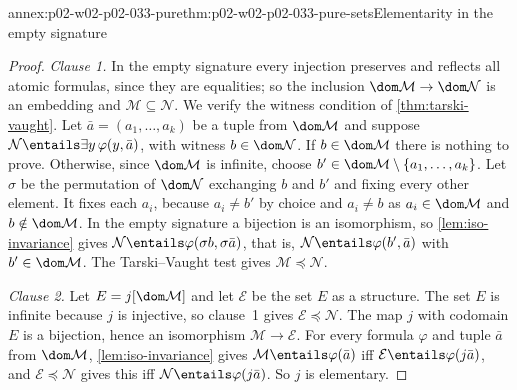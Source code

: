 \begin{annexitem}{annex:p02-w02-p02-033-pure}{thm:p02-w02-p02-033-pure-sets}{Elementarity in the empty signature}
\begin{proof}
\emph{Clause 1.}  In the empty signature every injection preserves and
reflects all atomic formulas, since they are equalities; so the inclusion
\(\dom\mathcal M\to\dom\mathcal N\) is an embedding and
\(\mathcal M\subseteq\mathcal N\).  We verify the witness condition of
\cref{thm:tarski-vaught}.  Let \(\bar a=(a_1,\ldots,a_k)\) be a tuple from
\(\dom\mathcal M\) and suppose
\(\mathcal N\entails\exists y\,\varphi(y,\bar a)\), with witness \(b\in
\dom\mathcal N\).  If \(b\in\dom\mathcal M\) there is nothing to prove.
Otherwise, since \(\dom\mathcal M\) is infinite, choose
\(b'\in\dom\mathcal M\setminus\{a_1,\ldots,a_k\}\).  Let \(\sigma\) be the
permutation of \(\dom\mathcal N\) exchanging \(b\) and \(b'\) and fixing
every other element.  It fixes each \(a_i\), because \(a_i\ne b'\) by choice
and \(a_i\ne b\) as \(a_i\in\dom\mathcal M\) and \(b\notin\dom\mathcal M\).
In the empty signature a bijection is an isomorphism, so
\cref{lem:iso-invariance} gives
\(\mathcal N\entails\varphi(\sigma b,\sigma\bar a)\), that is,
\(\mathcal N\entails\varphi(b',\bar a)\) with \(b'\in\dom\mathcal M\).  The
Tarski--Vaught test gives \(\mathcal M\preccurlyeq\mathcal N\).

\emph{Clause 2.}  Let \(E=j[\dom\mathcal M]\) and let \(\mathcal E\) be the
set \(E\) as a structure.  The set \(E\) is infinite because \(j\) is
injective, so clause~1 gives \(\mathcal E\preccurlyeq\mathcal N\).  The map
\(j\) with codomain \(E\) is a bijection, hence an isomorphism
\(\mathcal M\to\mathcal E\).  For every formula \(\varphi\) and tuple
\(\bar a\) from \(\dom\mathcal M\), \cref{lem:iso-invariance} gives
\(\mathcal M\entails\varphi(\bar a)\) iff
\(\mathcal E\entails\varphi(j\bar a)\), and
\(\mathcal E\preccurlyeq\mathcal N\) gives this iff
\(\mathcal N\entails\varphi(j\bar a)\).  So \(j\) is elementary.
\end{proof}
\end{annexitem}


